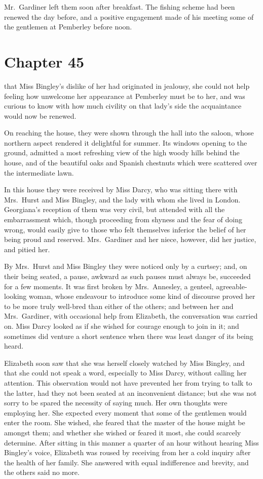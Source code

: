 Mr.\ Gardiner left them soon after breakfast.  The fishing scheme
had been renewed the day before, and a positive engagement
made of his meeting some of the gentlemen at Pemberley before
noon.



\chapter{Chapter 45}


 that Miss Bingley's dislike of
her had originated in jealousy, she could not help feeling how
unwelcome her appearance at Pemberley must be to her, and
was curious to know with how much civility on that lady's side
the acquaintance would now be renewed.

On reaching the house, they were shown through the hall into
the saloon, whose northern aspect rendered it delightful for
summer.  Its windows opening to the ground, admitted a most
refreshing view of the high woody hills behind the house,
and of the beautiful oaks and Spanish chestnuts which were
scattered over the intermediate lawn.

In this house they were received by Miss Darcy, who was
sitting there with Mrs.\ Hurst and Miss Bingley, and the lady
with whom she lived in London.  Georgiana's reception of them
was very civil, but attended with all the embarrassment which,
though proceeding from shyness and the fear of doing wrong,
would easily give to those who felt themselves inferior the
belief of her being proud and reserved.  Mrs.\ Gardiner and her
niece, however, did her justice, and pitied her.

By Mrs.\ Hurst and Miss Bingley they were noticed only by a
curtsey; and, on their being seated, a pause, awkward as such
pauses must always be, succeeded for a few moments.  It was
first broken by Mrs.\ Annesley, a genteel, agreeable-looking
woman, whose endeavour to introduce some kind of discourse
proved her to be more truly well-bred than either of the others;
and between her and Mrs.\ Gardiner, with occasional help from
Elizabeth, the conversation was carried on.  Miss Darcy looked
as if she wished for courage enough to join in it; and sometimes
did venture a short sentence when there was least danger of its
being heard.

Elizabeth soon saw that she was herself closely watched by Miss
Bingley, and that she could not speak a word, especially to Miss
Darcy, without calling her attention.  This observation would not
have prevented her from trying to talk to the latter, had they
not been seated at an inconvenient distance; but she was not sorry
to be spared the necessity of saying much.  Her own thoughts
were employing her.  She expected every moment that some of the
gentlemen would enter the room.  She wished, she feared that
the master of the house might be amongst them; and whether
she wished or feared it most, she could scarcely determine.
After sitting in this manner a quarter of an hour without hearing
Miss Bingley's voice, Elizabeth was roused by receiving from
her a cold inquiry after the health of her family.  She answered
with equal indifference and brevity, and the others said no more.

